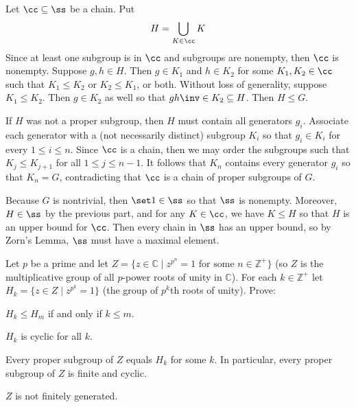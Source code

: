 \begin{solalph}
    \item Let $\cc \subseteq \ss$ be a chain. Put
    \[H = \bigcup_{K \in \cc}K\]
    Since at least one subgroup is in $\cc$ and subgroups are nonempty, then $\cc$ is nonempty. Suppose $g, h \in H$. Then $g \in K_1$ and $h \in K_2$ for some $K_1, K_2 \in \cc$ such that $K_1 \leq K_2$ or $K_2 \leq K_1$, or both. Without loss of generality, suppose $K_1 \leq K_2$. Then $g \in K_2$ as well so that $gh\inv \in K_2 \subseteq H$. Then $H \leq G$.
    \item If $H$ was not a proper subgroup, then $H$ must contain all generators $g_i$. Associate each generator with a (not necessarily distinct) subgroup $K_i$ so that $g_i \in K_i$ for every $1 \leq i \leq n$. Since $\cc$ is a chain, then we may order the subgroups such that $K_j \leq K_{j + 1}$ for all $1 \leq j \leq n - 1$. It follows that $K_n$ contains every generator $g_i$ so that $K_n = G$, contradicting that $\cc$ is a chain of proper subgroups of $G$. 
    \item Because $G$ is nontrivial, then $\set 1 \in \ss$ so that $\ss$ is nonempty. Moreover, $H \in \ss$ by the previous part, and for any $K \in \cc$, we have $K \leq H$ so that $H$ is an upper bound for $\cc$. Then every chain in $\ss$ has an upper bound, so by Zorn's Lemma, $\ss$ must have a maximal element.
\end{solalph}

\begin{exercise}\label{ex2.4.18} 
    Let $p$ be a prime and let $Z = \{z\in \mathbb{C} \mid z^{p^n}=1 \text{ for some } n\in \mathbb{Z}^+\}$ (so $Z$ is the multiplicative group of all $p$-power roots of unity in $\mathbb{C}$). For each $k\in \mathbb{Z}^+$ let $H_k = \{z\in Z \mid z^{p^k}=1\}$ (the group of $p^k$th roots of unity). Prove:
    \begin{subproblems}
        \item $H_k \le H_m$ if and only if $k\le m$.
        \item $H_k$ is cyclic for all $k$.
        \item Every proper subgroup of $Z$ equals $H_k$ for some $k$.  
        In particular, every proper subgroup of $Z$ is finite and cyclic.
        \item $Z$ is not finitely generated.
    \end{subproblems}
\end{exercise}

